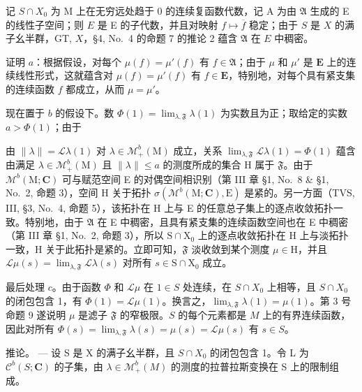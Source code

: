 记 \(S \cap X_0\) 为 M 上在无穷远处趋于 0 的连续复函数代数，记 A 为由 \(\mathfrak{A}\) 生成的 E 的线性子空间；则 \(E\) 是 E 的子代数，并且对映射 \(f \mapsto \overline{f}\) 稳定；由于 \(S\) 是 \(X\) 的满子幺半群，GT, \(X\)，§4, No.~4 的命题 7 的推论 2 蕴含 \(\mathfrak{A}\) 在 \(E\) 中稠密。

证明 \(a\)：根据假设，对每个 \(\mu(f) = \mu'(f)\) 有 \(f \in \mathfrak{A}\)；由于 \(\mu\) 和 \(\mu'\) 是 \(\mathbf{E}\) 上的连续线性形式，这就蕴含对 \(\mu(f) = \mu'(f)\) 有 \(f \in \mathbf{E}\)，特别地，对每个具有紧支集的连续函数 \(f\) 都成立，从而 \(\mu = \mu'\)。

现在置于 \(b\) 的假设下。数 \(\Phi(1) = \lim_{\lambda, \mathfrak{F}} \lambda(1)\) 为实数且为正；取给定的实数 \(a > \Phi(1)\)；由于

由 \(\| \lambda \| = \mathcal{L}\lambda (1)\) 对 \(\lambda \in \mathcal{M}_{+}^{b}(\mathrm{M})\) 成立，关系 \(\lim_{\lambda ,\mathfrak{F}}\mathcal{L}\lambda (1) = \Phi (1)\) 蕴含由满足 \(\lambda \in \mathcal{M}_{+}^{b}(\mathrm{M})\) 且 \(\| \lambda \| \leqslant a\) 的测度所成的集合 H 属于 \(\mathfrak{F}\)。由于 \(\mathcal{M}^b (\mathrm{M};\mathbf{C})\) 可与赋范空间 E 的对偶空间相识别（第 III 章 §1, No.~8 \& §1, No.~2, 命题 3），空间 H 关于拓扑 \(\sigma (\mathcal{M}^b (\mathrm{M};\mathbf{C}),\mathrm{E})\) 是紧的。另一方面（TVS, III, §3, No.~4, 命题 5），该拓扑在 H 上与 E 的任意总子集上的逐点收敛拓扑一致。特别地，由于 \(\mathfrak{A}\) 在 E 中稠密，且具有紧支集的连续函数空间也在 E 中稠密（第 III 章 §1, No.~2, 命题 3），所以 \(\mathrm{S}\cap \mathrm{X}_0\) 上的逐点收敛拓扑在 H 上与淡拓扑一致，H 关于此拓扑是紧的。立即可知，\(\mathfrak{F}\) 淡收敛到某个测度 \(\mu \in \mathrm{H}\)，并且 \(\mathcal{L}\mu (s) = \lim_{\lambda ,\mathfrak{F}}\mathcal{L}\lambda (s)\) 对所有 \(s\in \mathrm{S}\cap \mathrm{X}_0\) 成立。

最后处理 \(c\)。由于函数 \(\Phi\) 和 \(\mathcal{L}\mu\) 在 \(1 \in S\) 处连续，在 \(S \cap X_0\) 上相等，且 \(S \cap X_0\) 的闭包包含 1，有 \(\Phi(1) = \mathcal{L}\mu(1)\)。换言之，\(\lim_{\lambda, \mathfrak{F}} \lambda(1) = \mu(1)\)。第 3 号命题 9 遂说明 \(\mu\) 是滤子 \(\mathfrak{F}\) 的窄极限。\(S\) 的每个元素都是 \(M\) 上的有界连续函数，因此对所有 \(\Phi(s) = \lim_{\lambda, \mathfrak{F}} \lambda(s) = \mu(s) = \mathcal{L}\mu(s)\) 有 \(s \in S\)。

推论。 --- 设 S 是 X 的满子幺半群，且 \(S \cap X_{0}\) 的闭包包含 1。令 L 为 \(\mathcal{C}^{b}(S; \mathbf{C})\) 的子集，由 \(\lambda \in \mathcal{M}_{+}^{b}(M)\) 的测度的拉普拉斯变换在 S 上的限制组成。

